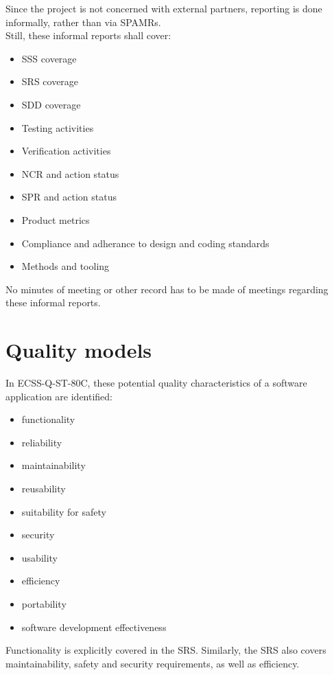 Since the project is not concerned with external partners, reporting is done
informally, rather than via \glspl{SPAMR}.\\

\noindent
Still, these informal reports shall cover:

\begin{itemize}
	\item \gls{SSS} coverage
	\item \gls{SRS} coverage
	\item \gls{SDD} coverage
	\item Testing activities
	\item Verification activities
	\item \gls{NCR} and action status
	\item \gls{SPR} and action status
	\item Product metrics
	\item Compliance and adherance to design and coding standards
	\item Methods and tooling
\end{itemize}

\noindent
No minutes of meeting or other record has to be made of meetings regarding
these informal reports.


\section{Quality models}

In ECSS-Q-ST-80C\cite{ECSS80C}, these potential quality characteristics of a
software application are identified:

\begin{multicols}{2}
\begin{itemize}
	\item functionality
	\item reliability
	\item maintainability
	\item reusability
	\item suitability for safety
	\item security
	\item usability
	\item efficiency
	\item portability
	\item software development effectiveness
\end{itemize}
\end{multicols}

\noindent
Functionality is explicitly covered in the \gls{SRS}\cite{leanosSRS}. Similarly,
the \gls{SRS} also covers maintainability, safety and security requirements, as
well as efficiency.\\

